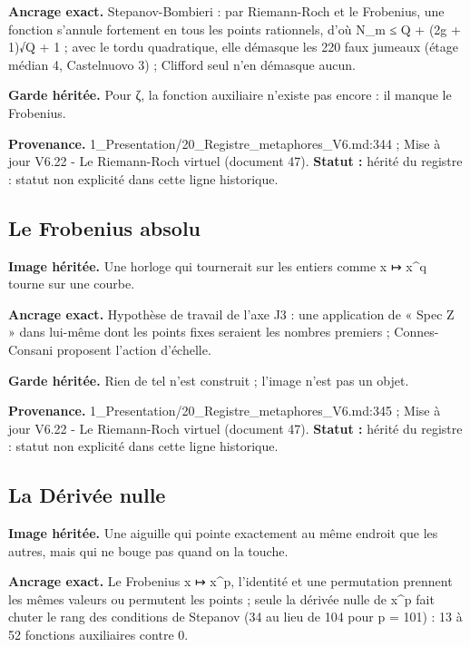 \documentclass[
  9pt,
  a4paper,
]{article}
\begin{document}
\textbf{Ancrage exact.} Stepanov-Bombieri : par Riemann-Roch et le
Frobenius, une fonction s'annule fortement en tous les points
rationnels, d'où N\_m ≤ Q + (2g + 1)√Q + 1 ; avec le tordu quadratique,
elle démasque les 220 faux jumeaux (étage médian 4, Castelnuovo 3) ;
Clifford seul n'en démasque aucun.

\textbf{Garde héritée.} Pour ζ, la fonction auxiliaire n'existe pas
encore : il manque le Frobenius.

\textbf{Provenance.} 1\_Presentation/20\_Registre\_metaphores\_V6.md:344
; Mise à jour V6.22 - Le Riemann-Roch virtuel (document 47).
\textbf{Statut :} hérité du registre : statut non explicité dans cette
ligne historique.

\hypertarget{le-frobenius-absolu}{%
\subsection{Le Frobenius absolu}\label{le-frobenius-absolu}}

\textbf{Image héritée.} Une horloge qui tournerait sur les entiers comme
x ↦ x\^{}q tourne sur une courbe.

\textbf{Ancrage exact.} Hypothèse de travail de l'axe J3 : une
application de « Spec Z » dans lui-même dont les points fixes seraient
les nombres premiers ; Connes-Consani proposent l'action d'échelle.

\textbf{Garde héritée.} Rien de tel n'est construit ; l'image n'est pas
un objet.

\textbf{Provenance.} 1\_Presentation/20\_Registre\_metaphores\_V6.md:345
; Mise à jour V6.22 - Le Riemann-Roch virtuel (document 47).
\textbf{Statut :} hérité du registre : statut non explicité dans cette
ligne historique.

\hypertarget{la-duxe9rivuxe9e-nulle}{%
\subsection{La Dérivée nulle}\label{la-duxe9rivuxe9e-nulle}}

\textbf{Image héritée.} Une aiguille qui pointe exactement au même
endroit que les autres, mais qui ne bouge pas quand on la touche.

\textbf{Ancrage exact.} Le Frobenius x ↦ x\^{}p, l'identité et une
permutation prennent les mêmes valeurs ou permutent les points ; seule
la dérivée nulle de x\^{}p fait chuter le rang des conditions de
Stepanov (34 au lieu de 104 pour p = 101) : 13 à 52 fonctions
auxiliaires contre 0.
\end{document}
